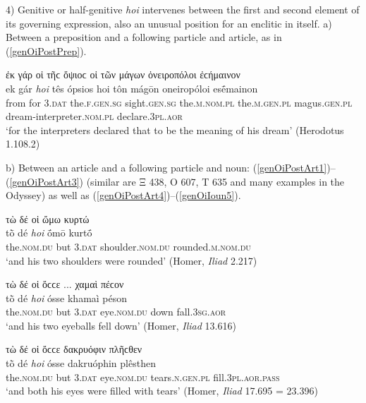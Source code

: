 4) Genitive or half-genitive \emph{hoi} intervenes between the first and second element of its governing expression, also an unusual position for an enclitic in itself.\label{nin} a) Between a preposition and a following particle and article, as in (\ref{genOiPostPrep}).

\begin{exe}
\ex ἐκ γάρ {οἱ} τῆϲ ὄψιοϲ οἱ τῶν μάγων ὀνειροπόλοι ἐϲήμαινον\\
\gll ek gár \emph{hoi} tês ópsios hoi tôn mágōn oneiropóloi esḗmainon\\
from for \textsc{3.dat} the.\textsc{f.gen.sg} sight.\textsc{gen.sg} the.\textsc{m.nom.pl} the.\textsc{m.gen.pl} magus.\textsc{gen.pl} dream-interpreter.\textsc{nom.pl} declare.\textsc{3pl.aor}\\
\trans `for the interpreters declared that to be the meaning of his dream' (Herodotus 1.108.2)
\label{genOiPostPrep}
\end{exe}

b) Between an article and a following particle and noun: (\ref{genOiPostArt1})--(\ref{genOiPostArt3}) (similar are Ξ 438, Ο 607, Τ 635 and many examples in the Odyssey) as well as (\ref{genOiPostArt4})--(\ref{genOiIoun5}).

\begin{exe}
\ex τὼ δέ {οἱ} ὤμω κυρτώ\\
\gll tṑ dé \emph{hoi} ṓmō kurtṓ\\
the.\textsc{nom.du} but \textsc{3.dat} shoulder.\textsc{nom.du} rounded.\textsc{m.nom.du}\\
\trans `and his two shoulders were rounded' (Homer, \emph{Iliad} 2.217)
\label{genOiPostArt1}
\end{exe}

\begin{exe}
\ex τὼ δέ {οἱ} ὄϲϲε ... χαμαὶ πέϲον\\
\gll tṑ dé \emph{hoi} ósse khamaì péson\\
the.\textsc{nom.du} but \textsc{3.dat} eye.\textsc{nom.du} down fall.\textsc{3sg.aor}\\
\trans `and his two eyeballs fell down' (Homer, \emph{Iliad} 13.616)
\label{genOiPostArt2}
\end{exe}

\begin{exe}
\ex τὼ δέ {οἱ} ὄϲϲε δακρυόφιν πλῆϲθεν\\
\gll tṑ dé \emph{hoi} ósse dakruóphin plêsthen\\
the.\textsc{nom.du} but \textsc{3.dat} eye.\textsc{nom.du} tears.\textsc{n.gen.pl} fill.\textsc{3pl.aor.pass}\\
\trans `and both his eyes were filled with tears' (Homer, \emph{Iliad} 17.695 = 23.396)
\label{genOiPostArt3}
\end{exe}

